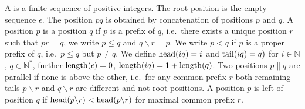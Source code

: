 
\begin{definition}\label{def:position}
	A  is a finite sequence of positive integers.
	The root position is the empty sequence \( \epsilon \).
	The position \( pq \) is obtained by concatenation of positions \( p \) and \( q \).
	A position \( p \) is  a position \( q \) if \( p \) is a prefix of \( q \),
	i.e.~there exists a unique position \( r \) such that \( pr = q \),
	we write \( p\leq q \) and \( q\backslash r = p \).
	We write \( p<q \) if \( p \) is a proper prefix of \( q \), i.e.~\( p\leq q \) but \( p\neq q \).
	We define \( \operatorname{head}(iq)=i \) and \( \operatorname{tail}(iq) = q) \) for \( i\in\mathbb{N} \), \( q\in\mathbb{N}^* \),
	further \( \operatorname{length}(\epsilon)=0 \), \( \operatorname{length}(iq) = 1 + \operatorname{length}(q) \).
%
	Two positions \( p\parallel q \) are parallel if none is above the other,
	i.e.~for any common prefix \( r \) both remaining tails
	\( p\backslash r \) and \( q\backslash r \) are different and not root positions.
	A position \( p \) is left of position \( q \) if \( \operatorname{head}(p\backslash r) < \operatorname{head}(p\backslash r) \)
	for maximal common prefix \( r \).

\end{definition}
